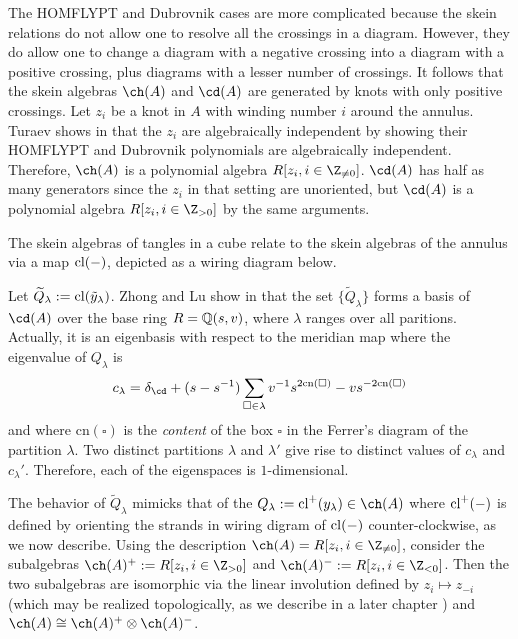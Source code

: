 The HOMFLYPT and Dubrovnik cases are more complicated because the skein relations do not allow one to resolve all the crossings in a diagram. However, they do allow one to change a diagram with a negative crossing into a diagram with a positive crossing, plus diagrams with a lesser number of crossings. It follows that the skein algebras $\ch(A)$ and $\cd(A)$ are generated by knots with only positive crossings. Let $z_i$ be a knot in $A$ with winding number $i$ around the annulus. Turaev shows in  that the $z_i$ are algebraically independent by showing their HOMFLYPT and Dubrovnik polynomials are algebraically independent. Therefore, $\ch(A)$ is a polynomial algebra $R[z_i, i \in \Z_{\neq 0}]$. $\cd(A)$ has half as many generators since the $z_i$ in that setting are unoriented, but $\cd(A)$ is a polynomial algebra $R[z_i, i \in \Z_{> 0}]$ by the same arguments. 


The skein algebras of tangles in a cube relate to the skein algebras of the annulus via a map $\mathrm{cl}(-)$, depicted as a wiring diagram below. 


Let $\widetilde{Q}_\lambda := \mathrm{cl}(\tilde{y}_\lambda)$. Zhong and Lu show in  that the set $\{ \widetilde{Q}_\lambda \}$ forms a basis of $\cd(A)$ over the base ring $R=\mathbb{Q}(s, v)$, where $\lambda$ ranges over all paritions. Actually, it is an eigenbasis with respect to the meridian map
where the eigenvalue of $Q_\lambda$ is 
\[
c_\lambda = \delta_\cd + (s - s^{-1}) \sum_{\square \in \lambda} v^{-1} s^{2 \textrm{cn}(\square)} - v s^{-2 \textrm{cn}(\square)}
\]
and where $\textrm{cn}(\square)$ is the \textit{content} of the box $\square$ in the Ferrer's diagram of the partition $\lambda$.  Two distinct partitions $\lambda$ and $\lambda '$ give rise to distinct values of $c_\lambda$ and $c_\lambda'$. Therefore, each of the eigenspaces is $1$-dimensional. 

The behavior of $\widetilde{Q}_\lambda$ mimicks that of the $Q_\lambda := \cl^+(y_\lambda) \in \ch(A)$ where $\mathrm{cl}^+(-)$ is defined by orienting the strands in wiring digram of $\mathrm{cl}(-)$ counter-clockwise, as we now describe. Using the description $\ch(A) = R[z_i, i \in \Z_{\neq 0}]$, consider the subalgebras $\ch(A)^+ := R[z_i, i \in \Z_{> 0}]$ and $\ch(A)^- := R[z_i, i \in \Z_{< 0}]$. Then the two subalgebras are isomorphic via the linear involution defined by $z_i \mapsto z_{-i}$ (which may be realized topologically, as we describe in a later chapter ) and $\ch(A) \cong \ch(A)^+ \otimes \ch(A)^-$. 

